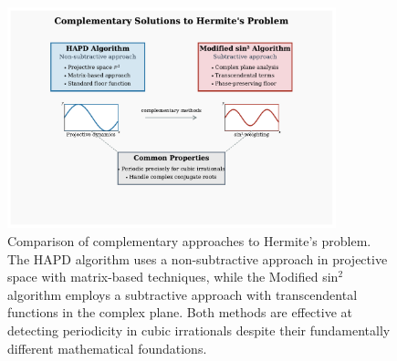 
\begin{figure}[p]
\centering
\vspace{2cm}
\includegraphics[width=0.85\textwidth]{figures/complementary_solutions_diagram.pdf}
\vspace{1.5cm}
\caption{Comparison of complementary approaches to Hermite's problem. The HAPD algorithm uses a non-subtractive approach in projective space with matrix-based techniques, while the Modified sin$^2$ algorithm employs a subtractive approach with transcendental functions in the complex plane. Both methods are effective at detecting periodicity in cubic irrationals despite their fundamentally different mathematical foundations.}
\label{fig:complementary_approaches}
\end{figure}
\clearpage

